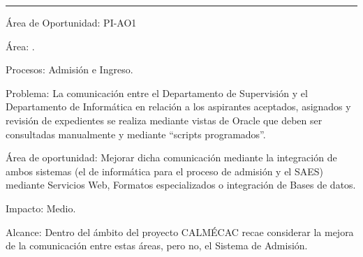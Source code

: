 \hrule
\begin{Cdescription}
	\item[Área de Oportunidad:] PI-AO1
	\item[Área:] .
	\item[Procesos:] Admisión e Ingreso.
	\item[Problema:] La comunicación entre el Departamento de Supervisión y el Departamento de Informática en relación a los aspirantes aceptados, asignados y revisión de expedientes se realiza mediante vistas de Oracle que deben ser consultadas manualmente y mediante ``scripts programados''.
	\item[Área de oportunidad:] Mejorar dicha comunicación mediante la integración de ambos sistemas (el de informática para el proceso de admisión y el SAES) mediante Servicios Web, Formatos especializados o integración de Bases de datos.
	\item[Impacto:] Medio.
	\item[Alcance:] Dentro del ámbito del proyecto CALMÉCAC recae considerar la mejora de la comunicación entre estas áreas, pero no, el Sistema de Admisión.
\end{Cdescription}

